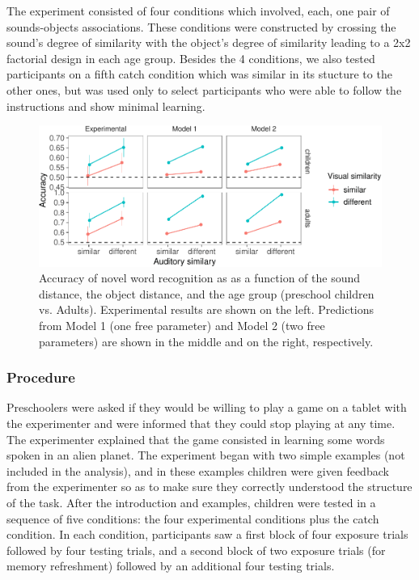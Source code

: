 \documentclass[10pt, letterpaper]{article}
\newenvironment{CodeChunk}{}{}
\begin{document}
The experiment consisted of four conditions which involved, each, one
pair of sounds-objects associations. These conditions were constructed
by crossing the sound's degree of similarity with the object's degree of
similarity leading to a 2x2 factorial design in each age group. Besides
the 4 conditions, we also tested participants on a fifth catch condition
which was similar in its stucture to the other ones, but was used only
to select participants who were able to follow the instructions and show
minimal learning.

\begin{CodeChunk}
\begin{figure}[h]

{\centering \includegraphics{figs/all_data-1} 

}

\caption{\label{fig:data_all}Accuracy of novel word recognition as as a function of the sound distance, the object distance, and the age group (preschool children vs. Adults). Experimental results are shown on the left. Predictions from Model 1 (one free parameter) and Model 2 (two free parameters) are shown in the middle and on the right, respectively.}\label{fig:all_data}
\end{figure}
\end{CodeChunk}

\subsubsection{Procedure}\label{procedure}

Preschoolers were asked if they would be willing to play a game on a
tablet with the experimenter and were informed that they could stop
playing at any time. The experimenter explained that the game consisted
in learning some words spoken in an alien planet. The experiment began
with two simple examples (not included in the analysis), and in these
examples children were given feedback from the experimenter so as to
make sure they correctly understood the structure of the task. After the
introduction and examples, children were tested in a sequence of five
conditions: the four experimental conditions plus the catch condition.
In each condition, participants saw a first block of four exposure
trials followed by four testing trials, and a second block of two
exposure trials (for memory refreshment) followed by an additional four
testing trials.
\end{document}
